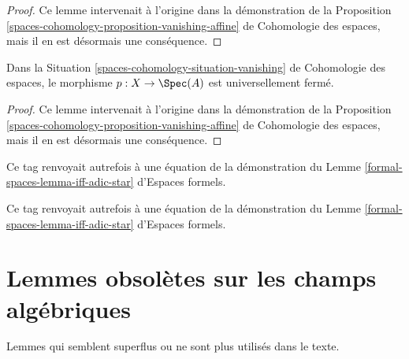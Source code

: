 \begin{proof}
Ce lemme intervenait à l'origine dans la démonstration de la
Proposition \ref{spaces-cohomology-proposition-vanishing-affine} de
Cohomologie des espaces, mais il en est désormais une conséquence.
\end{proof}

\begin{lemma}
\label{lemma-vanishing-universally-closed}
Dans la Situation \ref{spaces-cohomology-situation-vanishing} de Cohomologie des espaces,
le morphisme $p : X \to \Spec(A)$ est universellement fermé.
\end{lemma}

\begin{proof}
Ce lemme intervenait à l'origine dans la démonstration de la
Proposition \ref{spaces-cohomology-proposition-vanishing-affine} de
Cohomologie des espaces, mais il en est désormais une conséquence.
\end{proof}

\begin{remark}
\label{remark-equation-first}
Ce tag renvoyait autrefois à une équation de la démonstration du
Lemme \ref{formal-spaces-lemma-iff-adic-star} d'Espaces formels.
\end{remark}

\begin{remark}
\label{remark-equation-second}
Ce tag renvoyait autrefois à une équation de la démonstration du
Lemme \ref{formal-spaces-lemma-iff-adic-star} d'Espaces formels.
\end{remark}



\section{Lemmes obsolètes sur les champs algébriques}
\label{section-obsolete-on-stacks}

\noindent
Lemmes qui semblent superflus ou ne sont plus utilisés dans le texte.

